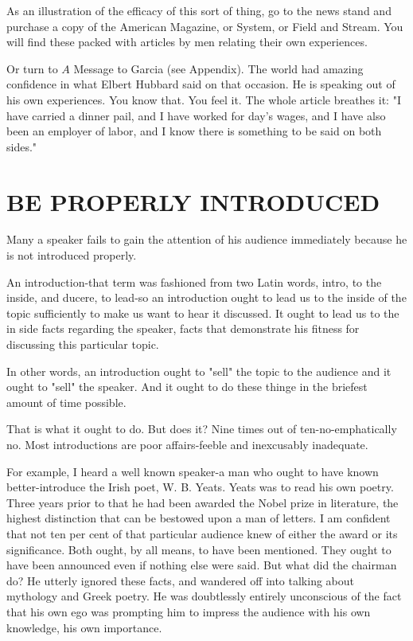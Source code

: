 \documentclass[10pt]{article}
\begin{document}
As an illustration of the efficacy of this sort of thing, go to the news stand and purchase a copy of the American Magazine, or System, or Field and Stream. You will find these packed with articles by men relating their own experiences.

Or turn to $A$ Message to Garcia (see Appendix). The world had amazing confidence in what Elbert Hubbard said on that occasion. He is speaking out of his own experiences. You know that. You feel it. The whole article breathes it: "I have carried a dinner pail, and I have worked for day's wages, and I have also been an employer of labor, and I know there is something to be said on both sides."

\section*{BE PROPERLY INTRODUCED}
Many a speaker fails to gain the attention of his audience immediately because he is not introduced properly.

An introduction-that term was fashioned from two Latin words, intro, to the inside, and ducere, to lead-so an introduction ought to lead us to the inside of the topic sufficiently to make us want to hear it discussed. It ought to lead us to the in side facts regarding the speaker, facts that demonstrate his fitness for discussing this particular topic.

In other words, an introduction ought to "sell" the topic to the audience and it ought to "sell" the speaker. And it ought to do these thinge in the briefest amount of time possible.

That is what it ought to do. But does it? Nine times out of ten-no-emphatically no. Most introductions are poor affairs-feeble and inexcusably inadequate.

For example, I heard a well known speaker-a man who ought to have known better-introduce the Irish poet, W. B. Yeats. Yeats was to read his own poetry. Three years prior to that he had been awarded the Nobel prize in literature, the highest distinction that can be bestowed upon a man of letters. I am confident that not ten per cent of that particular audience knew of either the award or its significance. Both ought, by all means, to have been mentioned. They ought to have been announced even if nothing else were said. But what did the chairman do? He utterly ignored these facts, and wandered off into talking about mythology and Greek poetry. He was doubtlessly entirely unconscious of the fact that his own ego was prompting him to impress the audience with his own knowledge, his own importance.
\end{document}
